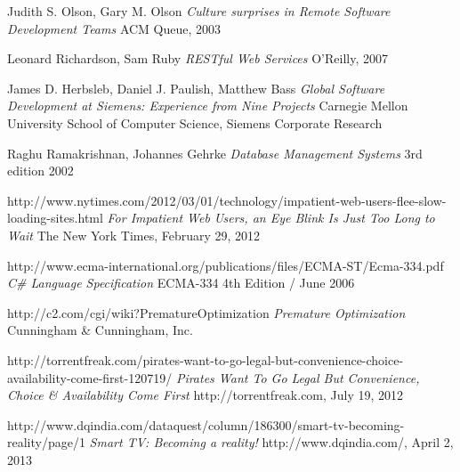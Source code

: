 \begin{thebibliography}{9}

		Judith S. Olson, Gary M. Olson\newline
		\emph{Culture surprises in Remote Software Development Teams}\newline
		ACM Queue, 2003

		Leonard Richardson, Sam Ruby\newline
		\emph{RESTful Web Services}
		O'Reilly, 2007
    
		James D. Herbsleb, Daniel J. Paulish, Matthew Bass\newline
		\emph{Global Software Development at Siemens: Experience from Nine Projects}
		Carnegie Mellon University School of Computer Science,
		Siemens Corporate Research 
	
		Raghu Ramakrishnan, Johannes Gehrke\newline
		\emph{Database Management Systems}\newline
		3rd edition 2002

		http://www.nytimes.com/2012/03/01/technology/impatient-web-users-flee-slow-loading-sites.html\newline
		\emph{For Impatient Web Users, an Eye Blink Is Just Too Long to Wait}\newline
		The New York Times, February 29, 2012

		http://www.ecma-international.org/publications/files/ECMA-ST/Ecma-334.pdf\newline
		\emph{C\# Language Specification }\newline
		ECMA-334 4th Edition / June 2006

		http://c2.com/cgi/wiki?PrematureOptimization\newline
		\emph{Premature Optimization}\newline
		Cunningham \& Cunningham, Inc.

		http://torrentfreak.com/pirates-want-to-go-legal-but-convenience-choice-availability-come-first-120719/\newline
		\emph{Pirates Want To Go Legal But Convenience, Choice \& Availability Come First}\newline
		http://torrentfreak.com, July 19, 2012

		http://www.dqindia.com/dataquest/column/186300/smart-tv-becoming-reality/page/1\newline
		\emph{Smart TV: Becoming a reality!}\newline
		http://www.dqindia.com/, April 2, 2013

\end{thebibliography}
